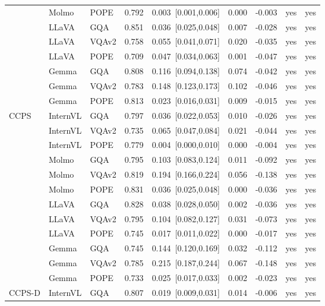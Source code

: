 \begin{longtable}{@{}lll rrrr cc@{}}
 & Molmo & POPE & 0.792 & 0.003~{\scriptsize[0.001,0.006]} & 0.000 & -0.003 & yes & yes \\
 & LLaVA & GQA & 0.851 & 0.036~{\scriptsize[0.025,0.048]} & 0.007 & -0.028 & yes & yes \\
 & LLaVA & VQAv2 & 0.758 & 0.055~{\scriptsize[0.041,0.071]} & 0.020 & -0.035 & yes & yes \\
 & LLaVA & POPE & 0.709 & 0.047~{\scriptsize[0.034,0.063]} & 0.001 & -0.047 & yes & yes \\
 & Gemma & GQA & 0.808 & 0.116~{\scriptsize[0.094,0.138]} & 0.074 & -0.042 & yes & yes \\
 & Gemma & VQAv2 & 0.783 & 0.148~{\scriptsize[0.123,0.173]} & 0.102 & -0.046 & yes & yes \\
 & Gemma & POPE & 0.813 & 0.023~{\scriptsize[0.016,0.031]} & 0.009 & -0.015 & yes & yes \\
\midrule
CCPS & InternVL & GQA & 0.797 & 0.036~{\scriptsize[0.022,0.053]} & 0.010 & -0.026 & yes & yes \\
 & InternVL & VQAv2 & 0.735 & 0.065~{\scriptsize[0.047,0.084]} & 0.021 & -0.044 & yes & yes \\
 & InternVL & POPE & 0.779 & 0.004~{\scriptsize[0.000,0.010]} & 0.000 & -0.004 & yes & yes \\
 & Molmo & GQA & 0.795 & 0.103~{\scriptsize[0.083,0.124]} & 0.011 & -0.092 & yes & yes \\
 & Molmo & VQAv2 & 0.819 & 0.194~{\scriptsize[0.166,0.224]} & 0.056 & -0.138 & yes & yes \\
 & Molmo & POPE & 0.831 & 0.036~{\scriptsize[0.025,0.048]} & 0.000 & -0.036 & yes & yes \\
 & LLaVA & GQA & 0.828 & 0.038~{\scriptsize[0.028,0.050]} & 0.002 & -0.036 & yes & yes \\
 & LLaVA & VQAv2 & 0.795 & 0.104~{\scriptsize[0.082,0.127]} & 0.031 & -0.073 & yes & yes \\
 & LLaVA & POPE & 0.745 & 0.017~{\scriptsize[0.011,0.022]} & 0.000 & -0.017 & yes & yes \\
 & Gemma & GQA & 0.745 & 0.144~{\scriptsize[0.120,0.169]} & 0.032 & -0.112 & yes & yes \\
 & Gemma & VQAv2 & 0.785 & 0.215~{\scriptsize[0.187,0.244]} & 0.067 & -0.148 & yes & yes \\
 & Gemma & POPE & 0.733 & 0.025~{\scriptsize[0.017,0.033]} & 0.002 & -0.023 & yes & yes \\
\midrule
CCPS-D & InternVL & GQA & 0.807 & 0.019~{\scriptsize[0.009,0.031]} & 0.014 & -0.006 & yes & yes \\

\end{longtable}
